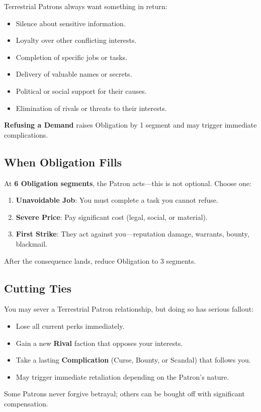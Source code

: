 Terrestrial Patrons always want something in return:
\begin{itemize}
    \item Silence about sensitive information.
    \item Loyalty over other conflicting interests.
    \item Completion of specific jobs or tasks.
    \item Delivery of valuable names or secrets.
    \item Political or social support for their causes.
    \item Elimination of rivals or threats to their interests.
\end{itemize}
\textbf{Refusing a Demand} raises Obligation by 1 segment and may trigger immediate complications.

\subsection{When Obligation Fills}
\label{sec:terrestrial-obligation-fill}

At \textbf{6 Obligation segments}, the Patron acts—this is not optional. Choose one:
\begin{enumerate}
    \item \textbf{Unavoidable Job}: You must complete a task you cannot refuse.
    \item \textbf{Severe Price}: Pay significant cost (legal, social, or material).
    \item \textbf{First Strike}: They act against you—reputation damage, warrants, bounty, blackmail.
\end{enumerate}
After the consequence lands, reduce Obligation to 3 segments.

\subsection{Cutting Ties}
\label{sec:terrestrial-cutting-ties}

You may sever a Terrestrial Patron relationship, but doing so has serious fallout:
\begin{itemize}
    \item Lose all current perks immediately.
    \item Gain a new \textbf{Rival} faction that opposes your interests.
    \item Take a lasting \textbf{Complication} (Curse, Bounty, or Scandal) that follows you.
    \item May trigger immediate retaliation depending on the Patron’s nature.
\end{itemize}
Some Patrons never forgive betrayal; others can be bought off with significant compensation.

